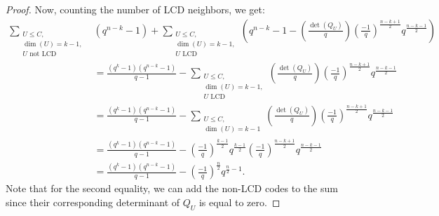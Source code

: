 \documentclass[11pt]{article}
\theoremstyle{definition}
\newcommand{\Leg}[2]{\left(\frac{#1}{#2}\right)}                       %
\begin{document}
\begin{proof}
	Now, counting the number of LCD neighbors, we get:
	\begin{align*}
		\sum_{\substack{
			U \leq C, \\
			\dim(U) = k - 1, \\
			\text{$U$ not LCD}
		}}
		&(q^{n - k} - 1)
		+ \sum_{\substack{
			U \leq C, \\
			\dim(U) = k - 1, \\
			\text{$U$ LCD}
		}}
		\left(
			q^{n - k} - 1 -
			\Leg{\det(Q_U)}{q}
			{\Leg{-1}{q}}^{\frac{n - k + 1}{2}}
			q^{\frac{n - k - 1}{2}}
		\right) \\
		&= \frac{(q^k - 1)(q^{n - k} - 1)}{q - 1}	 
		- \sum_{\substack{
			U \leq C, \\
			\dim(U) = k - 1, \\
			\text{$U$ LCD}
		}}
		\Leg{\det(Q_U)}{q}
		{\Leg{-1}{q}}^{\frac{n - k + 1}{2}}
		q^{\frac{n - k - 1}{2}} \\
		&= \frac{(q^k - 1) (q^{n - k} - 1)}{q - 1}	 
		- \sum_{\substack{
			U \leq C, \\
			\dim(U) = k - 1
		}}
		\Leg{\det(Q_U)}{q}
		{\Leg{-1}{q}}^{\frac{n - k + 1}{2}}
		q^{\frac{n - k - 1}{2}} \\
		&= \frac{(q^k - 1) (q^{n - k} - 1)}{q - 1}	 
		- {\Leg{-1}{q}}^{\frac{k - 1}{2}}
		q^{\frac{k - 1}{2}}
		{\Leg{-1}{q}}^{\frac{n - k + 1}{2}}
		q^{\frac{n - k - 1}{2}} \\
		&= \frac{(q^k - 1) (q^{n - k} - 1)}{q - 1}	 
		- {\Leg{-1}{q}}^{\frac{n}{2}}
		q^{\frac{n}{2} - 1}.
	\end{align*}
	Note that for the second equality, we can add the non-LCD codes to the sum since their corresponding determinant of $Q_U$ is equal to zero.
\end{proof}
\end{document}
